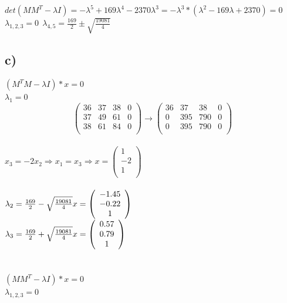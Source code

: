 \documentclass[a4paper,10pt]{article}
\begin{document}
$ det(MM^T-\lambda I) = -\lambda^5+169\lambda^4-2370\lambda^3 = -\lambda^3 * (\lambda^2-169 \lambda +2370) =0 $ \\
$\lambda_{1,2,3} =0 \ \ \lambda_{4,5}=\frac{169}{2} \pm \sqrt{\frac{19081}{4}}$
 \subsection*{c)}
 $ (M^TM-\lambda I)*x = 0 $ \\
 $\lambda_1=0$
 \[\left( \begin{array}{ccc|c}
36 & 37 & 38 & 0\\
37 & 49 & 61 & 0\\
38 & 61 & 84 & 0\\
\end{array} \right) \rightarrow  \left( \begin{array}{ccc|c}
36 & 37 & 38 & 0\\
0 & 395 & 790 & 0\\
0 & 395 & 790 & 0\\
\end{array} \right) \]\\
$x_3 = -2x_2 \Rightarrow x_1=x_3 \Rightarrow x= \left(
\begin{array}{c}
1\\
-2\\
1\\
\end{array}
\right) $ \\ \\
 $\lambda_2=\frac{169}{2} - \sqrt{\frac{19081}{4}} \\
 x= \left(
\begin{array}{c}
-1.45\\
-0.22\\
1\\
\end{array}
\right) $ \\
 $\lambda_3=\frac{169}{2} + \sqrt{\frac{19081}{4}} \\
 x= \left(
\begin{array}{c}
0.57\\
0.79\\
1\\
\end{array}
\right) $ \\ \\ \\
 $ (MM^T-\lambda I)*x = 0 $ \\
$\lambda_{1,2,3}=0$%
\end{document}
